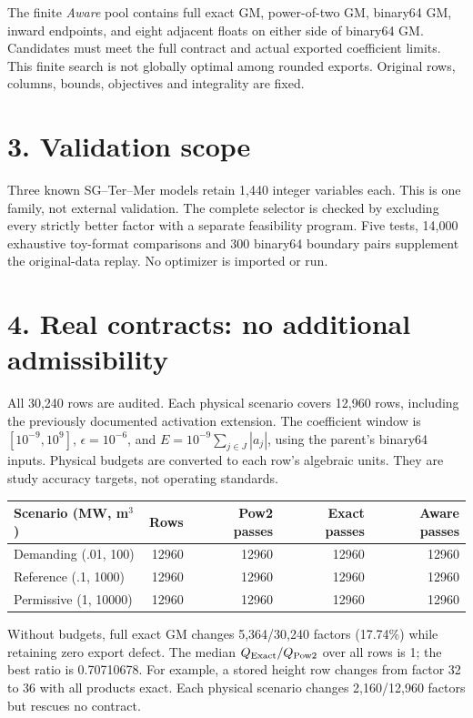 \documentclass[10pt,a4paper]{article}
\begin{document}
The finite \textit{Aware} pool contains full exact GM, power-of-two GM,
binary64 GM, inward endpoints, and eight adjacent floats on either side of
binary64 GM. Candidates must meet the full contract and actual exported
coefficient limits. This finite search is not globally optimal among rounded
exports. Original rows, columns, bounds, objectives and integrality are fixed.

\section*{3. Validation scope}
Three known SG--Ter--Mer models retain 1,440 integer variables each. This is
one family, not external validation. The complete selector is checked by
excluding every strictly better factor with a separate feasibility program.
Five tests, 14,000 exhaustive toy-format comparisons and 300 binary64 boundary
pairs supplement the original-data replay. No optimizer is imported or run.
\newpage
\section*{4. Real contracts: no additional admissibility}
All 30,240 rows are audited. Each physical scenario covers 12,960 rows,
including the previously documented activation extension. The coefficient
window is $[10^{-9},10^9]$, $\epsilon=10^{-6}$, and
$E=10^{-9}\sum_{j\in J}|a_j|$, using the parent's binary64 inputs.
Physical budgets are converted to each row's algebraic units. They are study
accuracy targets, not operating standards.

\begin{center}\small
\begin{tabular}{lrrrr}\toprule
Scenario (MW, m$^3$)&Rows&Pow2 passes&Exact passes&Aware passes\\\midrule
Demanding (.01, 100)&12960&12960&12960&12960\\
Reference (.1, 1000)&12960&12960&12960&12960\\
Permissive (1, 10000)&12960&12960&12960&12960\\\bottomrule
\end{tabular}\end{center}

Without budgets, full exact GM changes 5,364/30,240 factors (17.74\%) while
retaining zero export defect. The median $Q_{\rm Exact}/Q_{\rm Pow2}$ over all
rows is 1; the best ratio is 0.70710678. For example, a stored height row changes
from factor 32 to 36 with all products exact. Each physical scenario changes
2,160/12,960 factors but rescues no contract.
\end{document}
